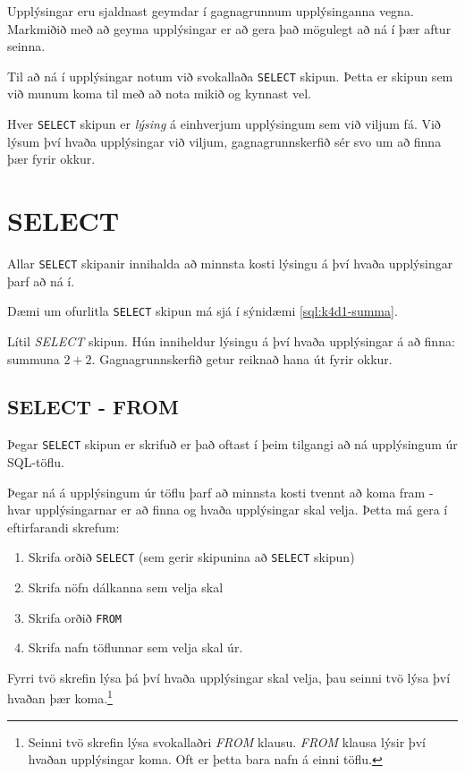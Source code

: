 Upplýsingar eru sjaldnast geymdar í gagnagrunnum upplýsinganna vegna. Markmiðið með að geyma upplýsingar er að gera það mögulegt að ná í þær aftur seinna.

Til að ná í upplýsingar notum við svokallaða \verb|SELECT| skipun. Þetta er skipun sem við munum koma til með að nota mikið og kynnast vel.

Hver \verb|SELECT| skipun er \emph{lýsing} á einhverjum upplýsingum sem við viljum fá. Við lýsum því hvaða upplýsingar við viljum, gagnagrunnskerfið sér svo um að finna þær fyrir okkur.
\section{SELECT}
Allar \verb|SELECT| skipanir innihalda að minnsta kosti lýsingu á því hvaða upplýsingar þarf að ná í.

Dæmi um ofurlitla \verb|SELECT| skipun má sjá í sýnidæmi \ref{sql:k4d1-summa}.

\begin{example}
\caption[Lágmarks SELECT]{Lítil \emph{SELECT} skipun. Hún inniheldur lýsingu á því hvaða upplýsingar á að finna: summuna $2+2$. Gagnagrunnskerfið getur reiknað hana út fyrir okkur.}
\label{sql:k4d1-summa}
\centering
{}
\end{example}

\subsection{SELECT - FROM}
\label{undirkafli:from}
Þegar \verb|SELECT| skipun er skrifuð er það oftast í þeim tilgangi að ná upplýsingum úr SQL-töflu.

Þegar ná á upplýsingum úr töflu þarf að minnsta kosti tvennt að koma fram - hvar upplýsingarnar er að finna og hvaða upplýsingar skal velja. Þetta má gera í eftirfarandi skrefum:

\begin{enumerate}
 \item Skrifa orðið \verb|SELECT| (sem gerir skipunina að \verb|SELECT| skipun)
 \item Skrifa nöfn dálkanna sem velja skal
 \item Skrifa orðið \verb|FROM|
 \item Skrifa nafn töflunnar sem velja skal úr.
\end{enumerate}
Fyrri tvö skrefin lýsa þá því hvaða upplýsingar skal velja, þau seinni tvö lýsa því hvaðan þær koma.\footnote{Seinni tvö skrefin lýsa svokallaðri \emph{FROM} klausu. \emph{FROM} klausa lýsir því hvaðan upplýsingar koma. Oft er þetta bara nafn á einni töflu.}

